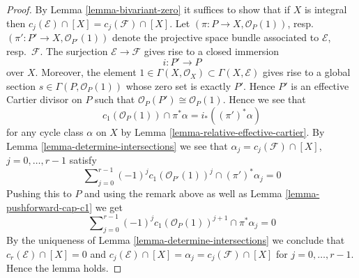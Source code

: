 \documentclass[10pt,a4paper]{amsart}
\theoremstyle{plain}
\theoremstyle{definition}
\theoremstyle{remark}
\numberwithin{equation}{subsection}
\begin{document}
\begin{proof}
By Lemma \ref{lemma-bivariant-zero}
it suffices to show that if $X$ is integral
then $c_j(\mathcal{E}) \cap [X] = c_j(\mathcal{F}) \cap [X]$.
Let $(\pi : P \to X, \mathcal{O}_P(1))$,
resp.\ $(\pi' : P' \to X, \mathcal{O}_{P'}(1))$ denote the
projective space bundle associated to $\mathcal{E}$, resp.\ $\mathcal{F}$.
The surjection $\mathcal{E} \to \mathcal{F}$ gives rise
to a closed immersion
$$
i : P' \longrightarrow P
$$
over $X$. Moreover, the element
$1 \in \Gamma(X, \mathcal{O}_X) \subset \Gamma(X, \mathcal{E})$
gives rise to a global section $s \in \Gamma(P, \mathcal{O}_P(1))$
whose zero set is exactly $P'$. Hence $P'$ is an effective Cartier
divisor on $P$ such that $\mathcal{O}_P(P') \cong \mathcal{O}_P(1)$.
Hence we see that
$$
c_1(\mathcal{O}_P(1)) \cap \pi^*\alpha = i_*((\pi')^*\alpha)
$$
for any cycle class $\alpha$ on $X$ by
Lemma \ref{lemma-relative-effective-cartier}.
By Lemma \ref{lemma-determine-intersections} we see that
$\alpha_j = c_j(\mathcal{F}) \cap [X]$, $j = 0, \ldots, r - 1$
satisfy
$$
\sum\nolimits_{j = 0}^{r - 1} (-1)^jc_1(\mathcal{O}_{P'}(1))^j
\cap (\pi')^*\alpha_j = 0
$$
Pushing this to $P$ and using the remark above as well as
Lemma \ref{lemma-pushforward-cap-c1} we get
$$
\sum\nolimits_{j = 0}^{r - 1}
(-1)^j c_1(\mathcal{O}_P(1))^{j + 1}
\cap \pi^*\alpha_j = 0
$$
By the uniqueness of Lemma \ref{lemma-determine-intersections}
we conclude that
$c_r(\mathcal{E}) \cap [X] = 0$ and
$c_j(\mathcal{E}) \cap [X] = \alpha_j = c_j(\mathcal{F}) \cap [X]$
for $j = 0, \ldots, r - 1$. Hence the lemma holds.
\end{proof}
\end{document}

